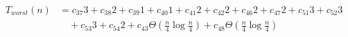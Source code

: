 \begin{align}
\label{eq:analyse-checksquare-case2}
T_{worst}(n)& =
c_{37}3 + c_{38}2 + c_{39}1 + c_{40}1 + c_{41}2 + c_{42}2 + c_{46}2 + c_{47}2 + c_{51}3 + c_{52}3
\\
& \quad
+ c_{53}3 + c_{54}2
+ c_{43}\Theta(\frac{n}{4} \log \frac{n}{4})
+ c_{48}\Theta(\frac{n}{4} \log \frac{n}{4})
\nonumber
\end{align}
